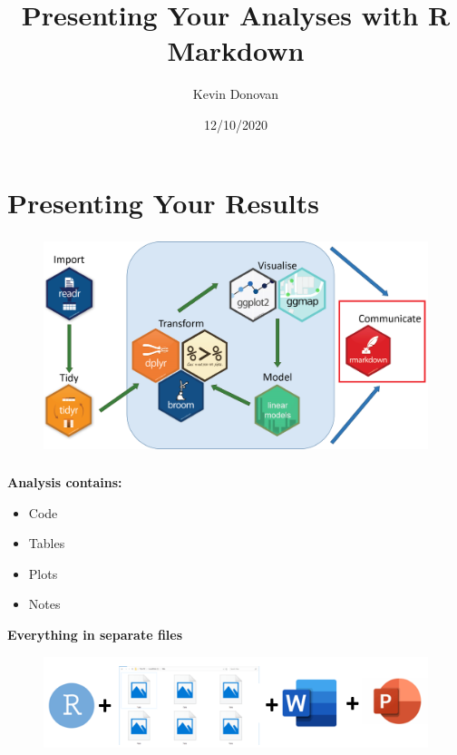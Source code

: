 \documentclass[xcolor=dvipsnames]{beamer}
\title[R Markdown]{Presenting Your Analyses with R Markdown}
\author[Kevin Donovan]{Kevin Donovan}
\institute[UNC and IBIS]{UNC-Chapel Hill and IBIS Network}
\date[12/10/2020]{12/10/2020}
\begin{document}
\begin{frame}
	\titlepage
\end{frame}

\section{Presenting Your Results}
\begin{frame}
\frametitle{\insertsectionhead}
\begin{figure}
\includegraphics[scale=0.2]{images/tidyverse.png}
\end{figure}
\end{frame}

\begin{frame}
\frametitle{\insertsectionhead}
\textbf{Analysis contains:}
\begin{itemize}
\item Code
\item Tables
\item Plots
\item Notes
\end{itemize}
\textbf{Everything in separate files}
\begin{figure}
\includegraphics[scale=0.6]{images/logos_combined.png}
\end{figure}
\end{frame}
\end{document}
